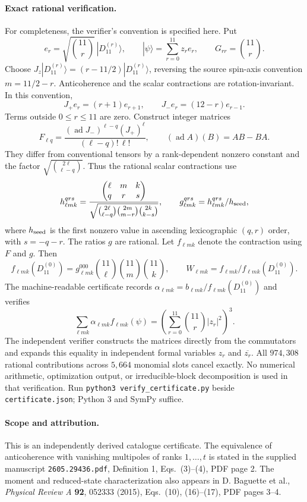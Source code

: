 \documentclass[11pt]{article}
\begin{document}
\paragraph{Exact rational verification.} For completeness, the verifier's convention is specified here. Put
\[
 e_r=\sqrt{\binom{11}{r}}\,|D_{11}^{(r)}\rangle,
 \qquad |\psi\rangle=\sum_{r=0}^{11}z_r e_r,
 \qquad G_{rr}=\binom{11}{r}.
\]
Choose $J_z|D_{11}^{(r)}\rangle=(r-11/2)|D_{11}^{(r)}\rangle$, reversing the source spin-axis convention $m=11/2-r$. Anticoherence and the scalar contractions are rotation-invariant. In this convention,
\[
 J_+e_r=(r+1)e_{r+1},\qquad J_-e_r=(12-r)e_{r-1}.
\]
Terms outside $0\le r\le11$ are zero. Construct integer matrices
\[
 F_{\ell q}=\frac{(\operatorname{ad}J_-)^{\ell-q}(J_+)^{\ell}}{(\ell-q)!\,\ell!},
 \qquad (\operatorname{ad}A)(B)=AB-BA.
\]
They differ from conventional tensors by a rank-dependent nonzero constant and the factor $\sqrt{\binom{2\ell}{\ell-q}}$. Thus the rational scalar contractions use
\[
 h^{qrs}_{\ell m k}=\frac{\begin{pmatrix}\ell&m&k\\q&r&s\end{pmatrix}}
 {\sqrt{\binom{2\ell}{\ell-q}\binom{2m}{m-r}\binom{2k}{k-s}}},
 \qquad g^{qrs}_{\ell m k}=h^{qrs}_{\ell m k}/h_{\rm seed},
\]
where $h_{\rm seed}$ is the first nonzero value in ascending lexicographic $(q,r)$ order, with $s=-q-r$. The ratios $g$ are rational. Let $f_{\ell m k}$ denote the contraction using $F$ and $g$. Then
\[
 f_{\ell m k}(D_{11}^{(0)})=g^{000}_{\ell m k}
 \binom{11}{\ell}\binom{11}{m}\binom{11}{k},
 \qquad W_{\ell m k}=f_{\ell m k}/f_{\ell m k}(D_{11}^{(0)}).
\]
The machine-readable certificate records $\alpha_{\ell m k}=b_{\ell m k}/f_{\ell m k}(D_{11}^{(0)})$ and verifies
\[
 \sum_{\ell m k}\alpha_{\ell m k}f_{\ell m k}(\psi)
 =\left(\sum_{r=0}^{11}\binom{11}{r}|z_r|^2\right)^3.
\]
The independent verifier constructs the matrices directly from the commutators and expands this equality in independent formal variables $z_r$ and $\overline{z_r}$. All $974{,}308$ rational contributions across $5{,}664$ monomial slots cancel exactly. No numerical arithmetic, optimization output, or irreducible-block decomposition is used in that verification. Run \texttt{python3 verify\_certificate.py} beside \texttt{certificate.json}; Python 3 and SymPy suffice.

\paragraph{Scope and attribution.} This is an independently derived catalogue certificate. The equivalence of anticoherence with vanishing multipoles of ranks $1,\ldots,t$ is stated in the supplied manuscript \texttt{2605.29436.pdf}, Definition 1, Eqs.~(3)--(4), PDF page 2. The moment and reduced-state characterization also appears in D. Baguette et al., \emph{Physical Review A} \textbf{92}, 052333 (2015), Eqs.~(10), (16)--(17), PDF pages 3--4.
\end{document}
